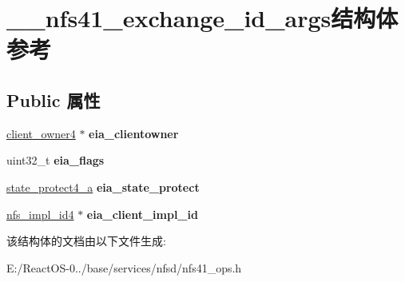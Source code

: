 \hypertarget{struct____nfs41__exchange__id__args}{}\section{\+\_\+\+\_\+nfs41\+\_\+exchange\+\_\+id\+\_\+args结构体 参考}
\label{struct____nfs41__exchange__id__args}
\subsection*{Public 属性}
\begin{DoxyCompactItemize}
\item 
\mbox{\label{struct____nfs41__exchange__id__args_a5f81c058d343a2b370302132e451616c}} 
\hyperlink{struct____client__owner4}{client\+\_\+owner4} $\ast$ {\bfseries eia\+\_\+clientowner}
\item 
\mbox{\label{struct____nfs41__exchange__id__args_ad168cce222a489f577a47da7864407ff}} 
uint32\+\_\+t {\bfseries eia\+\_\+flags}
\item 
\mbox{\label{struct____nfs41__exchange__id__args_a712b8b830957e9ac97ee61a075395358}} 
\hyperlink{struct____state__protect4__a}{state\+\_\+protect4\+\_\+a} {\bfseries eia\+\_\+state\+\_\+protect}
\item 
\mbox{\label{struct____nfs41__exchange__id__args_a703c810748631a12eda8e23d5aec8287}} 
\hyperlink{struct____nfs__impl__id4}{nfs\+\_\+impl\+\_\+id4} $\ast$ {\bfseries eia\+\_\+client\+\_\+impl\+\_\+id}
\end{DoxyCompactItemize}


该结构体的文档由以下文件生成\+:\begin{DoxyCompactItemize}
\item 
E\+:/\+React\+O\+S-\/0../base/services/nfsd/nfs41\+\_\+ops.\+h\end{DoxyCompactItemize}
